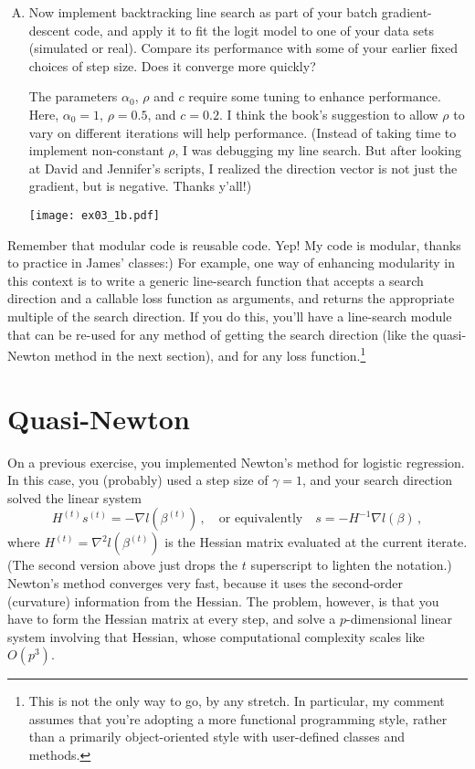 \documentclass{article}
\begin{document}
\begin{enumerate}[(A)]
\item Now implement backtracking line search as part of your batch gradient-descent code, and apply it to fit the logit model to one of your data sets (simulated or real).  Compare its performance with some of your earlier fixed choices of step size.  Does it converge more quickly?

\color{blue}
The parameters $\alpha_0$, $\rho$ and $c$ require some tuning to enhance performance. Here,  $\alpha_0 = 1$,
$\rho = 0.5$, and $c = 0.2$. I think the book's suggestion to allow $\rho$ to vary on different iterations will help performance. (Instead of taking time to implement non-constant $\rho$, I was debugging my line search. But after looking at David and Jennifer's scripts, I realized the direction vector is not just the gradient, but is negative. Thanks y'all!)

\begin{center}
\texttt{[image: ex03\_1b.pdf]}
\end{center}
\color{black}

\end{enumerate}

Remember that modular code is reusable code.  \color{blue}Yep! My code is modular, thanks to practice in James' classes:)  \color{black} For example, one way of enhancing modularity in this context is to write a generic line-search function that accepts a search direction and a callable loss function as arguments, and returns the appropriate multiple of the search direction.  If you do this, you'll have a line-search module that can be re-used for any method of getting the search direction (like the quasi-Newton method in the next section), and for any loss function.\footnote{This is not the only way to go, by any stretch.  In particular, my comment assumes that you're adopting a more functional programming style, rather than a primarily object-oriented style with user-defined classes and methods.}


\section{Quasi-Newton}

On a previous exercise, you implemented Newton's method for logistic regression.  In this case, you (probably) used a step size of $\gamma = 1$, and your search direction solved the linear system
$$
H^{(t)} s^{(t)} = - \nabla l(\beta^{(t)}) \, , \quad \mbox{or equivalently} \quad  s = -H^{-1} \nabla l(\beta) \, ,
$$
where $H^{(t)} = \nabla^2 l(\beta^{(t)})$ is the Hessian matrix evaluated at the current iterate.  (The second version above just drops the $t$ superscript to lighten the notation.)    Newton's method converges very fast, because it uses the second-order (curvature) information from the Hessian.  The problem, however, is that you have to form the Hessian matrix at every step, and solve a $p$-dimensional linear system involving that Hessian, whose computational complexity scales like $O(p^3)$.
\end{document}
